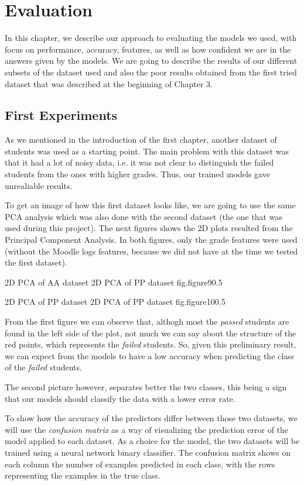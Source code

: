 \chapter{Evaluation}

In this chapter, we describe our approach to evaluating the models we used, 
with focus on performance, accuracy, features, as well as how confident we 
are in the answers given by the models. We are going to describe the results 
of our different subsets of the dataset used and also the poor results obtained 
from the first tried dataset that was described at the beginning of Chapter 3.

\section{First Experiments}
As we mentioned in the introduction of the first chapter, another dataset of 
students was used as a starting point. The main problem with this dataset was 
that it had a lot of noisy data, i.e. it was not clear to distinguish the 
failed students from the ones with higher grades. Thus, our trained models 
gave unrealiable results. 

To get an image of how this first dataset looks like, we are going to use 
the same PCA analysis which was also done with the second dataset (the one 
that was used during this project). The next figures shows the 2D plots resulted 
from the Principal Component Analysis. In both figures, only the grade features 
were used (without the Moodle logs features, because we did not have at the time 
we tested the first dataset).

%
    {2D PCA of AA dataset}%
    {2D PCA of PP dataset}%
    {fig.figure9}{0.5}

%
    {2D PCA of PP dataset}%
    {2D PCA of PP dataset}%
    {fig.figure10}{0.5}

From the first figure we can observe that, althogh most the {\it passed} students 
are found in the left side of the plot, not much we can say about the structure 
of the red points, which represents the {\it failed} students. So, given this 
preliminary result, we can expect from the models to have a low accuracy when 
predicting the class of the {\it failed} students. 

The second picture however, separates better the two classes, this being a 
sign that our models should classify the data with a lower error rate.

To show how the accuracy of the predictors differ between those two 
datasets, we will use the {\it confusion matrix} as a way of visualizing the 
prediction error of the model applied to each dataset. As a choice for the 
model, the two datasets will be trained using a neural network binary classifier. 
The confusion matrix shows on each column the number of examples predicted 
in each class, with the rows representing the examples in the true class. 

